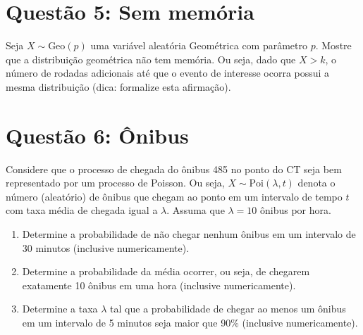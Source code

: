 \documentclass[12 pt]{article}
\begin{document}
\section*{Questão 5: Sem memória}
Seja $X \sim \text{Geo}(p)$ uma variável aleatória Geométrica com parâmetro $p$. Mostre que a distribuição
geométrica não tem memória. Ou seja, dado que $X > k$, o número de rodadas adicionais até que o evento
de interesse ocorra possui a mesma distribuição (dica: formalize esta afirmação).
\begin{tcolorbox}[colframe=black, title=Resposta:]

\end{tcolorbox}

\section*{Questão 6: Ônibus}
Considere que o processo de chegada do ônibus 485 no ponto do CT seja bem representado por um
processo de Poisson. Ou seja, $X \sim \text{Poi}(\lambda, t)$ denota o número (aleatório) de ônibus que chegam ao ponto
em um intervalo de tempo $t$ com taxa média de chegada igual a $\lambda$. Assuma que $\lambda = 10$ ônibus por hora.

\begin{enumerate}
    \item Determine a probabilidade de não chegar nenhum ônibus em um intervalo de 30 minutos (inclusive
          numericamente).
          \begin{tcolorbox}[colframe=black, title=Resposta:]

          \end{tcolorbox}
    \item Determine a probabilidade da média ocorrer, ou seja, de chegarem exatamente 10 ônibus em uma
          hora (inclusive numericamente).
          \begin{tcolorbox}[colframe=black, title=Resposta:]

          \end{tcolorbox}
    \item Determine a taxa $\lambda$ tal que a probabilidade de chegar ao menos um ônibus em um intervalo de 5
          minutos seja maior que 90\% (inclusive numericamente).
          \begin{tcolorbox}[colframe=black, title=Resposta:]

          \end{tcolorbox}
\end{enumerate}
\end{document}
